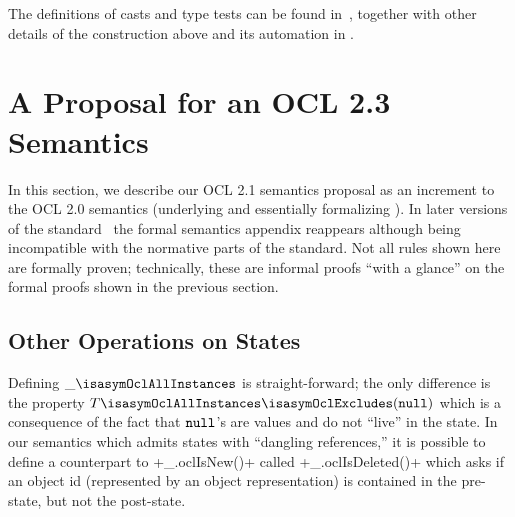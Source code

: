 The definitions of casts and type tests can be found
in~\cite{brucker.ea:extensible:2008-b}, together with other details of the
construction above and its automation in \holocl.

\chapter{A Proposal for an OCL 2.3 Semantics}\label{sec:hol-ocl2-semantics}
In this section, we describe our OCL 2.1 semantics proposal as an increment to
the OCL 2.0 semantics (underlying \holocl and essentially formalizing
\cite[Annex A]{omg:ocl:2003}). In later versions of the
standard~\cite{omg:ocl:2006,omg:ocl:2012} the formal semantics appendix reappears although
being incompatible with the normative parts of the standard.  Not all rules
shown here are formally proven; technically, these are informal proofs ``with a
glance'' on the formal proofs shown in the previous section.

\section{Other Operations on States}
Defining $\_\isasymOclAllInstances$
is straight-forward; the only difference is the property
$T\isasymOclAllInstances\isasymOclExcludes(\isasymOclNull)$ which is a
consequence of the fact that ${\mathtt{null}_\text{{}}}$'s are values and do not ``live'' in the
state.  In our semantics which admits states with ``dangling references,'' it is
possible to define a counterpart to \inlineocl+_.oclIsNew()+ called
\inlineocl+_.oclIsDeleted()+ which asks if an object id (represented by an object
representation) is contained in the pre-state, but not the post-state.

